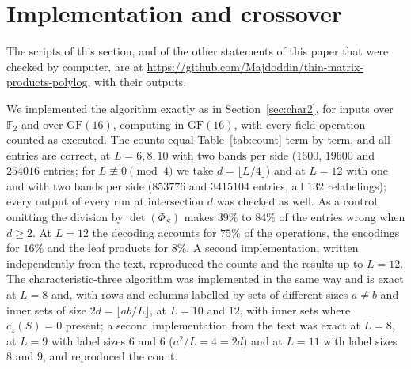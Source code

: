 \documentclass[11pt]{article}
\theoremstyle{definition}
\theoremstyle{remark}
\newcommand{\F}{\mathbb{F}}
\newcommand{\GF}{\mathrm{GF}}
\begin{document}
\section{Implementation and crossover}\label{sec:checks}

The scripts of this section, and of the other statements of this paper that were checked by computer, are at \url{https://github.com/Majdoddin/thin-matrix-products-polylog}, with their outputs.

We implemented the algorithm exactly as in Section~\ref{sec:char2}, for inputs over $\F_2$ and over $\GF(16)$, computing in $\GF(16)$, with every field operation counted as executed. The counts equal Table~\ref{tab:count} term by term, and all entries are correct, at $L=6,8,10$ with two bands per side ($1600$, $19600$ and $254016$ entries; for $L\not\equiv0\pmod4$ we take $d=\lfloor L/4\rfloor$) and at $L=12$ with one and with two bands per side ($853776$ and $3415104$ entries, all $132$ relabelings); every output of every run at intersection $d$ was checked as well. As a control, omitting the division by $\det(\Phi_S)$ makes $39\%$ to $84\%$ of the entries wrong when $d\ge2$. At $L=12$ the decoding accounts for $75\%$ of the operations, the encodings for $16\%$ and the leaf products for $8\%$. A second implementation, written independently from the text, reproduced the counts and the results up to $L=12$. The characteristic-three algorithm was implemented in the same way and is exact at $L=8$ and, with rows and columns labelled by sets of different sizes $a\ne b$ and inner sets of size $2d=\lfloor ab/L\rfloor$, at $L=10$ and $12$, with inner sets where $c_z(S)=0$ present; a second implementation from the text was exact at $L=8$, at $L=9$ with label sizes $6$ and $6$ ($a^2/L=4=2d$) and at $L=11$ with label sizes $8$ and $9$, and reproduced the count.
\end{document}
